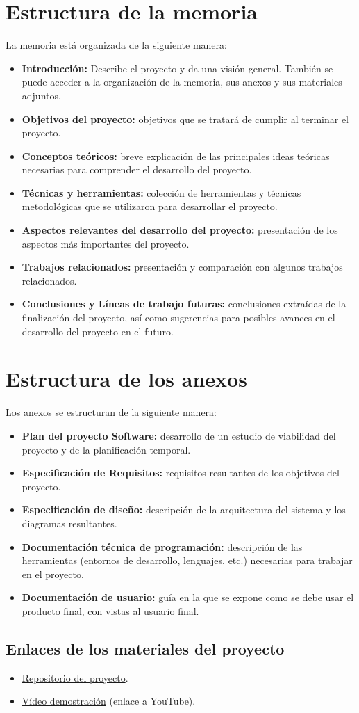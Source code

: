 \section{Estructura de la memoria}

La memoria está organizada de la siguiente manera:

\begin{itemize}
\item
  \textbf{Introducción:} Describe el proyecto y da una visión general. También se puede acceder a la organización de la memoria, sus anexos y sus materiales adjuntos.
\item
  \textbf{Objetivos del proyecto:} objetivos que se tratará de cumplir al terminar el proyecto. 
\item
  \textbf{Conceptos teóricos:} breve explicación de las principales ideas teóricas necesarias para comprender el desarrollo del proyecto.
\item
  \textbf{Técnicas y herramientas:} colección de herramientas y técnicas metodológicas que se utilizaron para desarrollar el proyecto.
\item
  \textbf{Aspectos relevantes del desarrollo del proyecto:} presentación de los aspectos más importantes del proyecto.
\item
  \textbf{Trabajos relacionados:} presentación y comparación con algunos trabajos relacionados.
\item
  \textbf{Conclusiones y Líneas de trabajo futuras:} conclusiones extraídas de la finalización del proyecto, así como sugerencias para posibles avances en el desarrollo del proyecto en el futuro.
\end{itemize}

\section{Estructura de los anexos}

Los anexos se estructuran de la siguiente manera:

\begin{itemize}
\item
  \textbf{Plan del proyecto Software:} desarrollo de un estudio de viabilidad del proyecto y de la planificación temporal.
\item
  \textbf{Especificación de Requisitos:} requisitos resultantes de los objetivos del proyecto.
\item
  \textbf{Especificación de diseño:} descripción de la arquitectura del sistema y los diagramas resultantes.
\item
  \textbf{Documentación técnica de programación:} descripción de las herramientas (entornos de desarrollo, lenguajes, etc.) necesarias para trabajar en el proyecto.
\item
  \textbf{Documentación de usuario:} guía en la que se expone como se debe usar el producto final, con vistas al usuario final.
\end{itemize}

\subsection{Enlaces de los materiales del proyecto}

\begin{itemize}
\item
	\href{https://github.com/fmv1001/F1RacePredictor}{Repositorio del proyecto}.
\item
	\href{https://youtu.be/rLXteMbnrWw}{Vídeo demostración} (enlace a YouTube).
\end{itemize}